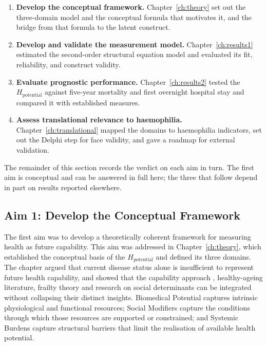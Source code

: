 \begin{enumerate}
  \item \textbf{Develop the conceptual framework.} Chapter~\ref{ch:theory} set out the three-domain model and the conceptual formula that motivates it, and the bridge from that formula to the latent construct.
  \item \textbf{Develop and validate the measurement model.} Chapter~\ref{ch:results1} estimated the second-order structural equation model and evaluated its fit, reliability, and construct validity.
  \item \textbf{Evaluate prognostic performance.} Chapter~\ref{ch:results2} tested the $H_{\text{potential}}$ against five-year mortality and first overnight hospital stay and compared it with established measures.
  \item \textbf{Assess translational relevance to haemophilia.} Chapter~\ref{ch:translational} mapped the domains to haemophilia indicators, set out the Delphi \citep{hasson_2000} step for face validity, and gave a roadmap for external validation.
\end{enumerate}

\noindent The remainder of this section records the verdict on each aim in turn. The
first aim is conceptual and can be answered in full here; the three that follow
depend in part on results reported elsewhere.

\subsection{Aim 1: Develop the Conceptual Framework}

The first aim was to develop a theoretically coherent framework for measuring health as future capability. This aim was addressed in Chapter~\ref{ch:theory}, which established the conceptual basis of the $H_{\text{potential}}$ and defined its three domains. The chapter argued that current disease status alone is insufficient to represent future health capability, and showed that the capability approach \citep{sen_1993,venkatapuram_2011}, healthy-ageing literature, frailty theory and research on social determinants can be integrated without collapsing their distinct insights. Biomedical Potential captures intrinsic physiological and functional resources; Social Modifiers capture the conditions through which those resources are supported or constrained; and Systemic Burdens capture structural barriers that limit the realisation of available health potential.

